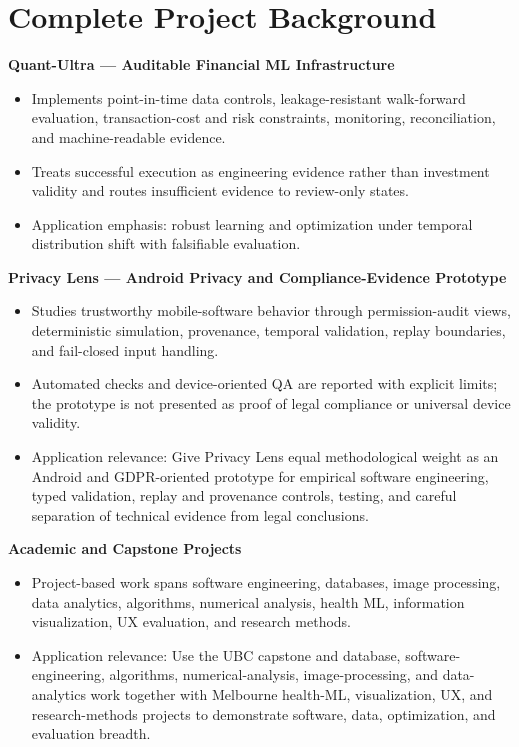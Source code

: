 \documentclass[11pt]{article}
\begin{document}
\section*{Complete Project Background}
\textbf{Quant-Ultra --- Auditable Financial ML Infrastructure}
\begin{itemize}
\item Implements point-in-time data controls, leakage-resistant walk-forward evaluation, transaction-cost and risk constraints, monitoring, reconciliation, and machine-readable evidence.
\item Treats successful execution as engineering evidence rather than investment validity and routes insufficient evidence to review-only states.
\item Application emphasis: robust learning and optimization under temporal distribution shift with falsifiable evaluation.
\end{itemize}

\textbf{Privacy Lens --- Android Privacy and Compliance-Evidence Prototype}
\begin{itemize}
\item Studies trustworthy mobile-software behavior through permission-audit views, deterministic simulation, provenance, temporal validation, replay boundaries, and fail-closed input handling.
\item Automated checks and device-oriented QA are reported with explicit limits; the prototype is not presented as proof of legal compliance or universal device validity.
\item Application relevance: Give Privacy Lens equal methodological weight as an Android and GDPR-oriented prototype for empirical software engineering, typed validation, replay and provenance controls, testing, and careful separation of technical evidence from legal conclusions.
\end{itemize}

\textbf{Academic and Capstone Projects}
\begin{itemize}
\item Project-based work spans software engineering, databases, image processing, data analytics, algorithms, numerical analysis, health ML, information visualization, UX evaluation, and research methods.
\item Application relevance: Use the UBC capstone and database, software-engineering, algorithms, numerical-analysis, image-processing, and data-analytics work together with Melbourne health-ML, visualization, UX, and research-methods projects to demonstrate software, data, optimization, and evaluation breadth.
\end{itemize}
\end{document}
